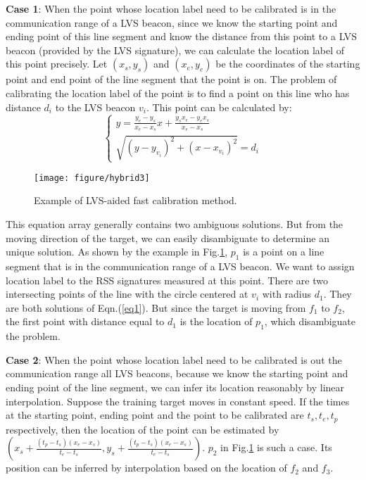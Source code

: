 \documentclass[conference, 10pt]{IEEEtran}
\begin{document}
\textbf{Case 1}: When the point whose location label need to be calibrated is in the communication range of a LVS beacon, since we know the starting point and ending point of this line segment and know the distance from this point to a LVS beacon (provided by the LVS signature), we can calculate the location label of this point precisely.  Let $(x_{s}, y_{s})$ and $(x_{e}, y_{e})$ be the coordinates of the starting point and end point of the line segment that the point is on. The problem of calibrating the location label of the point is to find a point on this line who has distance $d_{i}$ to the LVS beacon $v_{i}$. This point can be calculated by:
\begin{equation}
\left\{ {\begin{array}{*{20}{c}}
{y = \frac{{{y_e} - {y_s}}}{{{x_e} - {x_s}}}x + \frac{{{y_s}{x_e} - {y_e}{x_s}}}{{{x_e} - {x_s}}}}\\
{\sqrt {{{(y - {y_{{v_i}}})}^2} + {{(x - {x_{{v_i}}})}^2}}  = {d_i}}
\end{array}} \right.
\label{eq1}
\end{equation}

\begin{figure}[htbp]
\begin{center}
\texttt{[image: figure/hybrid3]}
\caption{Example of LVS-aided fast calibration method.}
\label{fig3}
\end{center}
\end{figure}
This equation array generally contains two ambiguous solutions. But from the moving direction of the target, we can easily disambiguate to determine an unique solution. As shown by the example in Fig.\ref{fig3}, $p_{1}$ is a point on a line segment that is in the communication range of a LVS beacon. We want to assign location label to the RSS signatures measured at this point. There are two intersecting points of  the line with the circle centered at $v_{i}$ with radius $d_{1}$. They are both solutions of Eqn.(\ref{eq1}). But since the target is moving from $f_{1}$ to $f_{2}$, the first point with distance equal to $d_{1}$ is the location of $p_{1}$, which disambiguate the problem. 


\textbf{Case 2}: When the point whose location label need to be calibrated is out the communication range all LVS beacons, because we know the starting point and ending point of the line segment, we can infer its location reasonably by linear interpolation. Suppose the training target moves in constant speed. If the times at the starting point, ending point and the point to be calibrated are $t_{s}, t_{e}, t_{p}$ respectively, then the location of the point can be estimated by $\left( {{x_s} + \frac{{({t_p} - {t_s})({x_e} - {x_s})}}{{{t_e} - {t_s}}},{y_s} + \frac{{({t_p} - {t_s})({x_e} - {x_s})}}{{{t_e} - {t_s}}}} \right)$. $p_{2}$ in Fig.\ref{fig3} is such a case. Its position can be inferred by interpolation based on the location of $f_{2}$ and $f_{3}$. 
\end{document}
